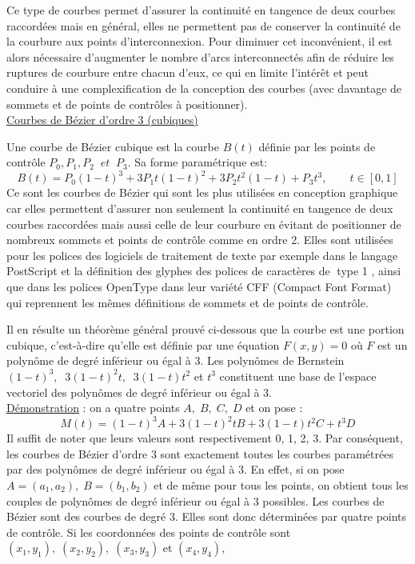 \documentclass{article}
\begin{document}
\newpage
Ce type de courbes permet d'assurer la continuit\'{e} en tangence de deux courbes raccord\'{e}es mais en g\'{e}n\'{e}ral, elles ne permettent pas de conserver la continuit\'{e} de la courbure aux points d'interconnexion. Pour diminuer cet inconv\'{e}nient, il est alors n\'{e}cessaire d'augmenter le nombre d'arcs interconnect\'{e}s afin de r\'{e}duire les ruptures de courbure entre chacun d'eux, ce qui en limite l'int\'{e}r\^{e}t et peut conduire \`{a} une complexification de la conception des courbes (avec davantage de sommets et de points de contr\^{o}les \`{a} positionner).
\\[10pt]
\underline{Courbes de B\'{e}zier d'ordre 3 (cubiques)}
\par
Une courbe de B\'{e}zier cubique est la courbe $B(t)$ d\'{e}finie par les points de contr\^{o}le $P_0 , P_1 , P_2 \;\; et \;\; P_3$.
Sa forme param\'{e}trique est:
\[B(t) = P_0 (1-t)^3 + 3P_1 t(1-t)^2 + 3P_2 t ^2 (1-t) + P_3 t^3 , \qquad t \in [0,1]\]
\indent  
Ce sont les courbes de B\'{e}zier qui sont les plus utilis\'{e}es en conception graphique car elles permettent d'assurer non seulement la continuit\'{e} en tangence de deux courbes raccordées mais aussi celle de leur courbure en \'{e}vitant de positionner de nombreux sommets et points de contr\^{o}le comme en ordre 2. Elles sont utilis\'{e}es pour les polices des logiciels de traitement de texte par exemple dans le langage PostScript et la d\'{e}finition des glyphes des polices de caract\`{e}res de \guillemotleft $\;$type 1 \guillemotright, ainsi que dans les polices OpenType dans leur vari\'{e}t\'{e} CFF (Compact Font Format) qui reprennent les m\^{e}mes d\'{e}finitions de sommets et de points de contr\^{o}le.
\par
Il en r\'{e}sulte un th\'{e}or\`{e}me g\'{e}n\'{e}ral prouv\'{e} ci-dessous que la courbe est une portion cubique, c'est-\`{a}-dire qu'elle est d\'{e}finie par une \'{e}quation $F(x, y) = 0$ o\`{u} $F$ est un polyn\^{o}me de degr\'{e} inf\'{e}rieur ou \'{e}gal \`{a} 3. Les polyn\^{o}mes de Bernstein $(1-t)^3, \;\; 3(1-t)^2 t, \;\; 3(1-t)t^2$ et $t^3$ constituent une base de l'espace vectoriel des polyn\^{o}mes de degr\'{e} inf\'{e}rieur ou \'{e}gal \`{a} 3.
\\[10pt]
\underline{D\'{e}monstration} : on a quatre points $A, \; B, \; C, \; D$ et on pose :
\[M(t) = (1 − t)^3 A + 3(1 − t)^2 t B + 3(1 − t)t^2 C + t^3 D\]
\indent
Il suffit de noter que leurs valeurs sont respectivement 0, 1, 2, 3. Par cons\'{e}quent, les courbes de B\'{e}zier d'ordre 3 sont exactement toutes les courbes param\'{e}tr\'{e}es par des polyn\^{o}mes de degr\'{e} inf\'{e}rieur ou \'{e}gal \`{a} 3. En effet, si on pose $A = (a_1, a_2), \; B = (b_1 , b_2 )$ et de m\^{e}me pour tous les points, on obtient tous les couples de polyn\^{o}mes de degré inf\'{e}rieur ou \'{e}gal \`{a} 3 possibles. Les courbes de B\'{e}zier sont des courbes de degré 3. Elles sont donc d\'{e}termin\'{e}es par quatre points de contr\^{o}le. Si les coordonn\'{e}es des points de contr\^{o}le sont $(x_1, y_1), \; (x_2, y_2), \; (x_3, y_3)$ et $(x_4, y_4)$,
\end{document}
